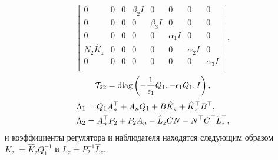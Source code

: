 \begin{theorem}
\begin{equation}
\begin{bmatrix}
			0&0&0& \beta_2{I}&0&0&0&0\\
			0&0&0&0&\beta_3{I}&0&0&0\\
			0&0&0&0&0& \alpha_1{I}&0&0\\
			{N}_2\hat{{K}}_z&0&0&0&0&0& \alpha_2{I}&0\\
			0&0&0&0&0&0&0&\alpha_3{I}\\
		\end{bmatrix},
	\end{equation}
	\begin{equation}
		\mathcal{T}_{22}=\textnormal{diag}\left(-\frac{1}{\epsilon_1}{Q}_1,-\epsilon_1{Q}_1,{I}\right),
	\end{equation}%
	\begin{align}
		\label{eq:Lambda_1}
		{\Lambda}_1&={Q}_1{A}_n^\top+{A}_n{Q}_1+{B}\hat{{K}}_z+\hat{{K}}_z^\top{B}^\top, \\
		\label{eq:Lambda_2}
		{\Lambda}_2&={A}_n^\top{P}_2+{P}_2{A}_n-\hat{{L}}_z{C}{N}-{N}^\top{C}^\top\hat{{L}}_z^\top,
	\end{align}
	и коэффициенты регулятора и наблюдателя находятся следующим образом ${K}_z\ = \hat{{K}}_z{Q}_1^{-1}$ и ${L}_z = {P}_2^{-1} \hat{{L}}_z$.
\end{theorem}
